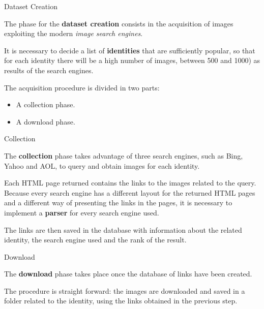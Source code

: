 \begin{tframe}{Dataset Creation}

The phase for the \textbf{dataset creation} consists in the acquisition of images exploiting the modern \textit{image search engines}.

\vspace{0.1in}

It is necessary to decide a list of \textbf{identities} that are sufficiently popular, so that for each identity there will be a high number of images, between 500 and 1000) as results of the search engines.

\vspace{0.1in}

The acquisition procedure is divided in two parts: 

\begin{itemize}
\item A collection phase.
\item A download phase.
\end{itemize}

\end{tframe}


\begin{tframe}{Collection}

The \textbf{collection} phase takes advantage of three search engines, such as Bing, Yahoo and AOL, to query and obtain images for each identity.

\vspace{0.1in}

Each HTML page returned contains the links to the images related to the query. Because every search engine has a different layout for the returned HTML pages and a different way of presenting the links in the pages, it is necessary to implement a \textbf{parser} for every search engine used.

\vspace{0.1in}

The links are then saved in the database with information about the related identity, the search engine used and the rank of the result.

\end{tframe}


\begin{tframe}{Download}


The \textbf{download} phase takes place once the database of links have been created. 

\vspace{0.1in}

The procedure is straight forward: the images are downloaded and saved in a folder related to the identity, using the links obtained in the previous step.


\end{tframe}